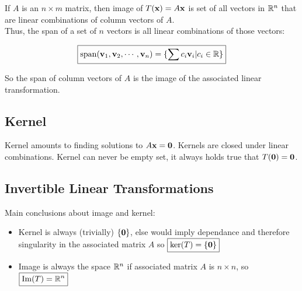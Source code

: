 If $A$ is an $n\times m$ matrix, then image of $T(\textbf{x})=A\textbf{x}$ is set of all vectors in $\mathbb{R}^n$
that are linear combinations of column vectors of $A$.\\

\noindent
Thus, the span of a set of $n$ vectors is all linear combinations of those vectors:

\[\boxed{
    \mathrm{span}(\textbf{v}_1,\textbf{v}_2,\cdots,\textbf{v}_n)=\{\sum c_i\textbf{v}_i | c_i\in\mathbb{R}\}
}\]

So the span of column vectors of $A$ is the image of the associated linear transformation.

\subsection{Kernel}

Kernel amounts to finding solutions to $A\textbf{x}=\textbf{0}$. Kernels are closed under linear combinations.
Kernel can never be empty set, it always holds true that $T(\textbf{0})=\textbf{0}$.

\subsection{Invertible Linear Transformations}

Main conclusions about image and kernel:

\begin{itemize}
    \item Kernel is always (trivially) $\{\textbf{0}\}$, else would imply dependance and therefore singularity in the associated matrix $A$
    so $\boxed{\mathrm{ker}(T)=\{\textbf{0}\}}$
    \item Image is always the space $\mathbb{R}^n$ if associated matrix $A$ is $n\times n$, so $\boxed{\mathrm{Im}(T)=\mathbb{R}^n}$
\end{itemize}